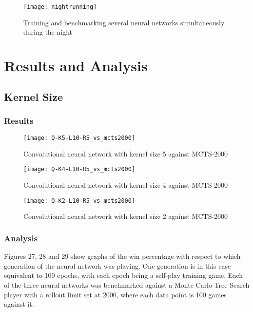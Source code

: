 \documentclass[titlepage]{article}
\begin{document}
\vskip 2cm

\begin{figure}[h]
    \center
    \texttt{[image: nightrunning]}
    \caption{Training and benchmarking several neural networks simultaneously during the night}
\end{figure}

\newpage

\section{Results and Analysis}

\subsection{Kernel Size}

\subsubsection{Results}

\vskip -0.7cm

\begin{figure}[h]
    \center
    \texttt{[image: Q-K5-L10-R5\_vs\_mcts2000]}
    \caption{Convolutional neural network with kernel size 5 against MCTS-2000}
\end{figure}

\begin{figure}[h]
    \center
    \texttt{[image: Q-K4-L10-R5\_vs\_mcts2000]}
    \caption{Convolutional neural network with kernel size 4 against MCTS-2000}
\end{figure}

\newpage

\begin{figure}[h]
    \center
    \texttt{[image: Q-K2-L10-R5\_vs\_mcts2000]}
    \caption{Convolutional neural network with kernel size 2 against MCTS-2000}
\end{figure}

\subsubsection{Analysis}

\vskip 0.5cm

Figures 27, 28 and 29 show graphs of the win percentage with respect to which generation of the neural network was playing. One generation is in this case equivalent to 100 epochs, with each epoch being a self-play training game. Each of the three neural networks was benchmarked against a Monte Carlo Tree Search player with a rollout limit set at 2000, where each data point is 100 games against it.
\end{document}
